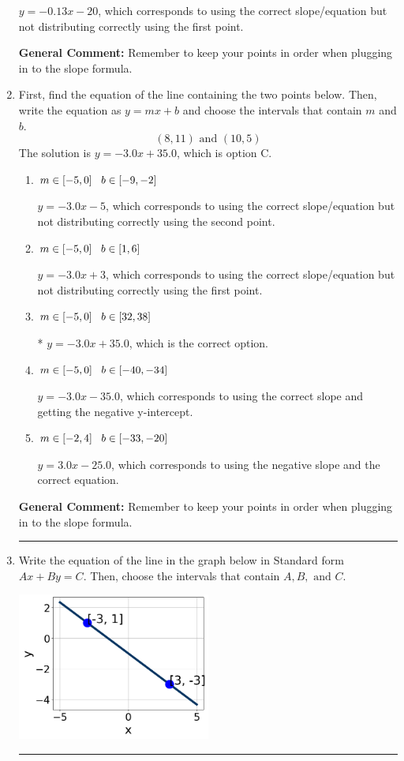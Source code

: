 \documentclass{extbook}[14pt]
\newcommand{\litem}[1]{\item #1

\rule{\textwidth}{0.4pt}}
\begin{document}
\begin{enumerate}
{\begin{enumerate}[label=\Alph*.]
 $y = -0.13x -20$, which corresponds to using the correct slope/equation but not distributing correctly using the first point.
\end{enumerate}

\textbf{General Comment:} Remember to keep your points in order when plugging in to the slope formula.
}
\litem{
First, find the equation of the line containing the two points below. Then, write the equation as $ y=mx+b $ and choose the intervals that contain $m$ and $b$.
\[ (8, 11) \text{ and } (10, 5) \]The solution is \( y = -3.0x + 35.0 \), which is option C.\begin{enumerate}[label=\Alph*.]
\item \( m \in [-5, 0] \hspace*{3mm} b \in [-9, -2] \)

 $y = -3.0x -5$, which corresponds to using the correct slope/equation but not distributing correctly using the second point.
\item \( m \in [-5, 0] \hspace*{3mm} b \in [1, 6] \)

 $y = -3.0x + 3$, which corresponds to using the correct slope/equation but not distributing correctly using the first point.
\item \( m \in [-5, 0] \hspace*{3mm} b \in [32, 38] \)

* $y = -3.0x + 35.0$, which is the correct option.
\item \( m \in [-5, 0] \hspace*{3mm} b \in [-40, -34] \)

 $y = -3.0x -35.0$, which corresponds to using the correct slope and getting the negative y-intercept.
\item \( m \in [-2, 4] \hspace*{3mm} b \in [-33, -20] \)

 $y = 3.0x -25.0$, which corresponds to using the negative slope and the correct equation.
\end{enumerate}

\textbf{General Comment:} Remember to keep your points in order when plugging in to the slope formula.
}
\litem{
Write the equation of the line in the graph below in Standard form $Ax+By=C$. Then, choose the intervals that contain $A, B, \text{ and } C$.

\begin{center}
    \includegraphics[width=0.5\textwidth]{../Figures/linearGraphToStandardCopyB.png}
\end{center}


}
\end{enumerate}
\end{document}
